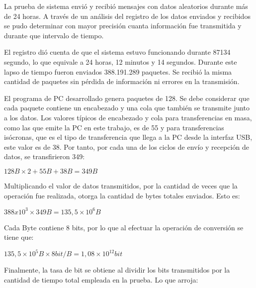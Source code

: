 La prueba de sistema envió y recibió mensajes con datos aleatorios durante más de 24 horas. A través de un análisis del registro de los datos enviados y recibidos se pudo determinar con mayor precisión cuanta información fue transmitida y durante que intervalo de tiempo.

El registro dió cuenta de que el sistema estuvo funcionando durante 87134 segundo, lo que equivale a 24 horas, 12 minutos y 14 segundos. Durante este lapso de tiempo fueron enviados 388.191.289 paquetes. Se recibió la misma cantidad de paquetes sin pérdida de información ni errores en la transmisión. 

El programa de PC desarrollado genera paquetes de \SI{128}{\byte}. Se debe considerar que cada paquete contiene un encabezado y una cola que también se transmite junto a los datos. Los valores típicos de encabezado y cola para transferencias en masa, como las que emite la PC en este trabajo, es de \SI{55}{\byte} y para transferencias isócronas, que es el tipo de transferencia que llega a la PC desde la interfaz USB, este valor es de \SI{38}{\byte}\cite{USBspec}. Por tanto, por cada una de los ciclos de envío y recepción de datos, se transfirieron \SI{349}{\byte}:

\begin{center}
	\begin{math}
		128 B \times 2 + 55 B + 38 B = 349 B 
	\end{math}
\end{center}

Multiplicando el valor de datos transmitidos, por la cantidad de veces que la operación fue realizada, otorga la cantidad de bytes totales enviados. Esto es:

\begin{center}
	\begin{math}
		388x10^3 \times 349 B = 135,5 \times 10^6 B
	\end{math}
\end{center}

Cada Byte contiene 8 bits, por lo que al efectuar la operación de conversión se tiene que:

\begin{center}
	\begin{math}
		135,5 \times 10^5 B \times 8 bit/B = 1,08 \times 10^12 bit
	\end{math}
\end{center}

Finalmente, la tasa de bit se obtiene al dividir los bits transmitidos por la cantidad de tiempo total empleada en la prueba. Lo que arroja:

